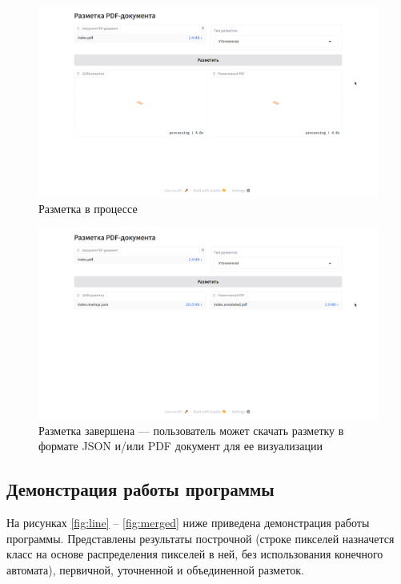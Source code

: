 \begin{figure}[H]
	\centering
	\includegraphics[width=\textwidth]{img/web-process.png}
    \caption{Разметка в процессе}
	\label{fig:webproc}
\end{figure}

\begin{figure}[H]
	\centering
	\includegraphics[width=\textwidth]{img/web-done.png}
    \caption{Разметка завершена --- пользователь может скачать разметку в формате JSON и/или PDF документ для ее визуализации}
	\label{fig:webdone}
\end{figure}

\newpage

\subsection{Демонстрация работы программы}

На рисунках \ref{fig:line} -- \ref{fig:merged} ниже приведена демонстрация работы программы.
Представлены результаты построчной (строке пикселей назначется класс на основе распределения пикселей в ней, без использования конечного автомата), первичной, уточненной и объединенной разметок.


